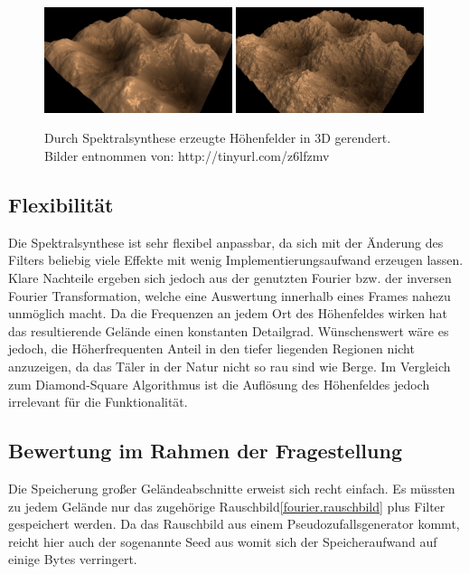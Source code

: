 \begin{figure}
	\centering
	{\includegraphics[width=0.49\textwidth]{images/fourier_24.jpg}}
	 {\includegraphics[width=0.49\textwidth]{images/fourier_20.jpg}}
	\caption{Durch Spektralsynthese erzeugte Höhenfelder in 3D gerendert. Bilder entnommen von: http://tinyurl.com/z6lfzmv}\label{img.fourierResult}
\end{figure}\label{test}

\subsection{Flexibilität}
Die Spektralsynthese ist sehr flexibel anpassbar, da sich mit der Änderung des Filters beliebig viele Effekte mit wenig Implementierungsaufwand erzeugen lassen. Klare Nachteile ergeben sich jedoch aus der genutzten Fourier bzw. der inversen Fourier Transformation, welche eine Auswertung innerhalb eines Frames nahezu unmöglich macht. Da die Frequenzen an jedem Ort des Höhenfeldes wirken hat das resultierende Gelände einen konstanten Detailgrad. Wünschenswert wäre es jedoch, die Höherfrequenten Anteil in den tiefer liegenden Regionen nicht anzuzeigen, da das Täler in der Natur nicht so rau sind wie Berge\label{unisotrop}. Im Vergleich zum Diamond-Square Algorithmus ist die Auflösung des Höhenfeldes jedoch irrelevant für die Funktionalität.

\subsection{Bewertung im Rahmen der Fragestellung}
Die Speicherung großer Geländeabschnitte erweist sich recht einfach. Es müssten zu jedem Gelände nur das zugehörige Rauschbild\ref{fourier.rauschbild} plus Filter gespeichert werden. Da das Rauschbild aus einem Pseudozufallsgenerator kommt, reicht hier auch der sogenannte Seed aus womit sich der Speicheraufwand auf einige Bytes verringert.